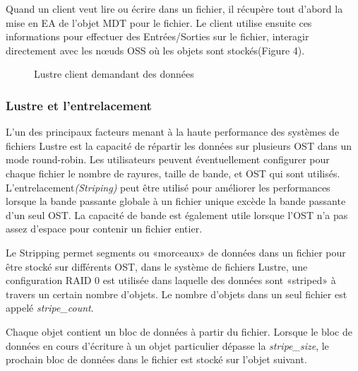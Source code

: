 \documentclass[12pt]{article}
\begin{document}
Quand un client veut lire ou écrire dans un fichier, il récupère tout d'abord la mise en EA de l'objet MDT pour le fichier. Le client utilise ensuite ces informations pour effectuer des Entrées/Sorties sur le fichier, interagir directement avec les nœuds OSS où les objets sont stockés(Figure 4).

\begin{figure}[Client-FS]
\caption{Lustre client demandant des données}
\label{fig:identification}
\end{figure}

\newpage
\subsubsection{Lustre et l'entrelacement}

L'un des principaux facteurs menant à la haute performance des systèmes de fichiers Lustre est la capacité de répartir les données sur plusieurs OST dans un mode round-robin. Les utilisateurs peuvent éventuellement configurer pour chaque fichier le nombre de rayures, taille de bande, et OST qui sont utilisés. \\

L'entrelacement\textit{(Striping)} peut être utilisé pour améliorer les performances lorsque la bande passante globale à un fichier unique excède la bande passante d'un seul OST. La capacité de bande est également utile lorsque l'OST n'a pas assez d'espace pour contenir un fichier entier.

Le Stripping permet segments ou «morceaux» de données dans un fichier pour être stocké sur différents OST, dans le système de fichiers Lustre, une configuration RAID 0 est utilisée dans laquelle des données sont «striped» à travers un certain nombre d'objets. Le nombre d'objets dans un seul fichier est appelé \textit{stripe\_count}.

Chaque objet contient un bloc de données à partir du fichier. Lorsque le bloc de données en cours d'écriture à un objet particulier dépasse la \textit{stripe\_size}, le prochain bloc de données dans le fichier est stocké sur l'objet suivant.
\end{document}
